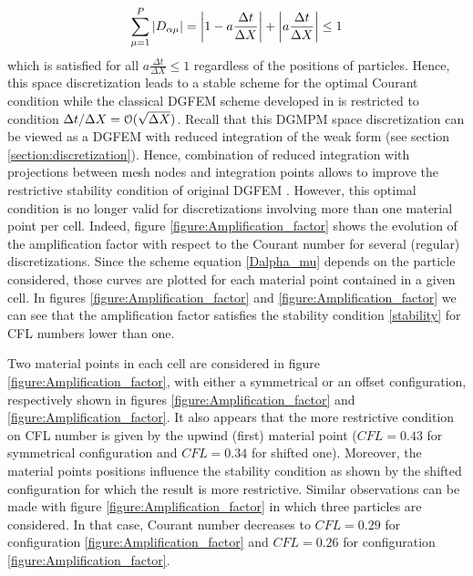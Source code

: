 \begin{equation}
\sum_{\mu=1}^P \left\vert D_{\alpha\mu}\right\vert = \left\vert1 - a\frac{\Delta t}{\Delta X} \right\vert +  \left\vert a\frac{\Delta t}{\Delta X} \right\vert \leq 1 \label{eq:1ppc_stab}
\end{equation}
which is satisfied for all $a\frac{\Delta t}{\Delta X} \leq 1$ regardless of the positions of particles.
Hence, this space discretization leads to a stable scheme for the optimal Courant condition while the classical DGFEM scheme developed in \cite{Chavent_Salzano} is restricted to condition $\Delta t / \Delta X = \mathcal{O}(\sqrt{\Delta X})$. Recall that this DGMPM space discretization can be viewed as a DGFEM with reduced integration of the weak form (see section \ref{section:discretization}). Hence, combination of reduced integration with projections between mesh nodes and integration points allows to improve the restrictive stability condition of original DGFEM \cite{Chavent_Salzano,NeutronDG}. However, this optimal condition is no longer valid for discretizations involving more than one material point per cell. Indeed, figure \ref{figure:Amplification_factor} shows the evolution of the amplification factor with respect to the Courant number for several (regular) discretizations. Since the scheme equation \eqref{Dalpha_mu} depends on the particle considered, those curves are plotted for each material point contained in a given cell. In figures \ref{figure:Amplification_factor} and \ref{figure:Amplification_factor} we can see that the amplification factor satisfies the stability condition \eqref{stability} for CFL numbers lower than one.

Two material points in each cell are considered in figure \ref{figure:Amplification_factor}, with either a symmetrical or an offset configuration, respectively shown in figures \ref{figure:Amplification_factor} and \ref{figure:Amplification_factor}. It also appears that the more restrictive condition on CFL number is given by the upwind (first) material point ($CFL=0.43$ for symmetrical configuration and $CFL=0.34$ for shifted one). Moreover, the material points positions influence the stability condition as shown by the shifted configuration for which the result is more restrictive. Similar observations can be made with figure \ref{figure:Amplification_factor} in which three particles are considered. In that case, Courant number decreases to $CFL=0.29$ for configuration \ref{figure:Amplification_factor} and $CFL=0.26$ for configuration \ref{figure:Amplification_factor}. 

